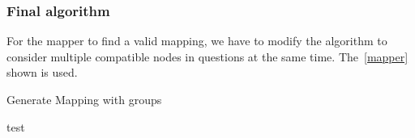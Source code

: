 \subsubsection{Final algorithm}

For the mapper to find a valid mapping, we have to modify the algorithm to
consider multiple compatible nodes in questions at the same time. The~\ref{mapper} shown is used.

\begin{algorithm}
\caption{Generate Mapping with groups}
\label{mapper}
\begin{algorithmic}
\item test
\end{algorithmic}
\end{algorithm}

